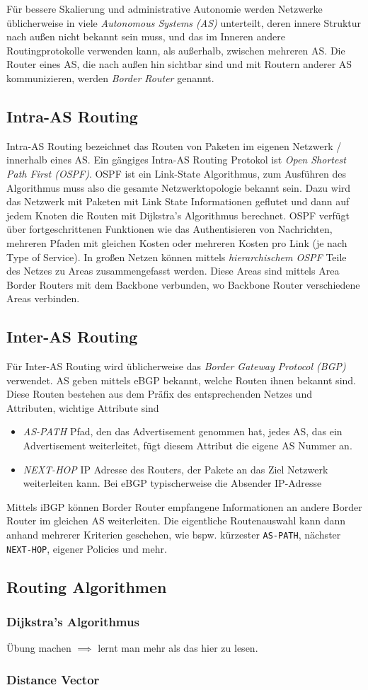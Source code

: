 Für bessere Skalierung und administrative Autonomie werden Netzwerke üblicherweise in viele \emph{Autonomous Systems (AS)} unterteilt, deren innere Struktur nach außen nicht bekannt sein muss, und das im Inneren andere Routingprotokolle verwenden kann, als außerhalb, zwischen mehreren AS. Die Router eines AS, die nach außen hin sichtbar sind und mit Routern anderer AS kommunizieren, werden \emph{Border Router} genannt.

\subsection{Intra-AS Routing}
Intra-AS Routing bezeichnet das Routen von Paketen im eigenen Netzwerk / innerhalb eines AS. Ein gängiges Intra-AS Routing Protokol ist \emph{Open Shortest Path First (OSPF)}. OSPF ist ein Link-State Algorithmus, zum Ausführen des Algorithmus muss also die gesamte Netzwerktopologie bekannt sein. Dazu wird das Netzwerk mit Paketen mit Link State Informationen geflutet und dann auf jedem Knoten die Routen mit Dijkstra's Algorithmus berechnet. OSPF verfügt über fortgeschrittenen Funktionen wie das Authentisieren von Nachrichten, mehreren Pfaden mit gleichen Kosten oder mehreren Kosten pro Link (je nach Type of Service).
In großen Netzen können mittels \emph{hierarchischem OSPF} Teile des Netzes zu Areas zusammengefasst werden. Diese Areas sind mittels Area Border Routers mit dem Backbone verbunden, wo Backbone Router verschiedene Areas verbinden.

\subsection{Inter-AS Routing}
Für Inter-AS Routing wird üblicherweise das \emph{Border Gateway Protocol (BGP)} verwendet. AS geben mittels eBGP bekannt, welche Routen ihnen bekannt sind. Diese Routen bestehen aus dem Präfix des entsprechenden Netzes und Attributen, wichtige Attribute sind
\begin{itemize}
    \item \emph{AS-PATH} Pfad, den das Advertisement genommen hat, jedes AS, das ein Advertisement weiterleitet, fügt diesem Attribut die eigene AS Nummer an.
    \item \emph{NEXT-HOP} IP Adresse des Routers, der Pakete an das Ziel Netzwerk weiterleiten kann. Bei eBGP typischerweise die Absender IP-Adresse
\end{itemize}
Mittels iBGP können Border Router empfangene Informationen an andere Border Router im gleichen AS weiterleiten. Die eigentliche Routenauswahl kann dann anhand mehrerer Kriterien geschehen, wie bspw. kürzester \lstinline{AS-PATH}, nächster \lstinline{NEXT-HOP}, eigener Policies und mehr.

\subsection{Routing Algorithmen}
\subsubsection{Dijkstra's Algorithmus}
Übung machen $\implies$ lernt man mehr als das hier zu lesen.
\subsubsection{Distance Vector}
